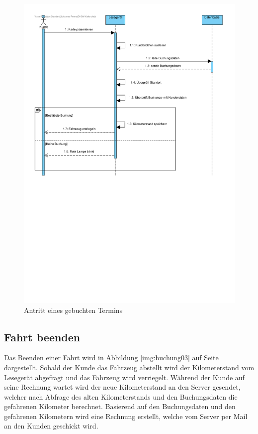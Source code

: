 \begin{figure}[!ht]
    \centering
    \includegraphics[width=\textwidth, trim = 0cm 13cm 0cm 0cm]{Bilder/Diagramme/SD_Buchungsvorgang_02.pdf}
    \caption{Antritt eines gebuchten Termins}
    \label{img:buchung02}
\end{figure}

\newpage

\subsection{Fahrt beenden}

Das Beenden einer Fahrt wird in Abbildung \ref{img:buchung03} auf Seite \pageref{img:buchung03} dargestellt. Sobald der Kunde das Fahrzeug abstellt wird der Kilometerstand vom Lesegerät abgefragt und das Fahrzeug wird verriegelt. Während der Kunde auf seine Rechnung wartet wird der neue Kilometerstand an den Server gesendet, welcher nach Abfrage des alten Kilometerstands und den Buchungsdaten die gefahrenen Kilometer berechnet. Basierend auf den Buchungsdaten und den gefahrenen Kilometern wird eine Rechnung erstellt, welche vom Server per Mail an den Kunden geschickt wird.


